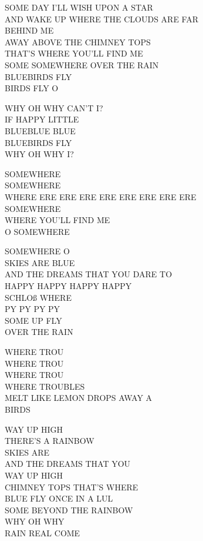 SOME DAY I'LL WISH UPON A STAR\\
AND WAKE UP WHERE THE CLOUDS ARE FAR\\
BEHIND ME\\
AWAY ABOVE THE CHIMNEY TOPS\\
THAT'S WHERE YOU'LL FIND ME\\
SOME SOMEWHERE OVER THE RAIN\\
BLUEBIRDS FLY\\
BIRDS FLY O\par

WHY OH WHY CAN'T I?\\
IF HAPPY LITTLE\\
BLUEBLUE BLUE\\
BLUEBIRDS FLY\\
WHY OH WHY I?\par

SOMEWHERE\\
SOMEWHERE\\
WHERE ERE ERE ERE ERE ERE ERE ERE ERE\\
SOMEWHERE\\
WHERE YOU'LL FIND ME\\
O SOMEWHERE\par

SOMEWHERE O\\
SKIES ARE BLUE\\
AND THE DREAMS THAT YOU DARE TO\\
HAPPY HAPPY HAPPY HAPPY\\
SCHLOß WHERE\\
PY PY PY PY\\
SOME UP FLY\\
OVER THE RAIN\par

WHERE TROU\\
WHERE TROU\\
WHERE TROU\\
WHERE TROUBLES\\
MELT LIKE LEMON DROPS AWAY A\\
BIRDS\par

WAY UP HIGH\\
THERE'S A RAINBOW\\
SKIES ARE\\
AND THE DREAMS THAT YOU\\
WAY UP HIGH\\
CHIMNEY TOPS THAT'S WHERE\\
BLUE FLY ONCE IN A LUL\\
SOME BEYOND THE RAINBOW\\
WHY OH WHY\\
RAIN REAL COME\par

